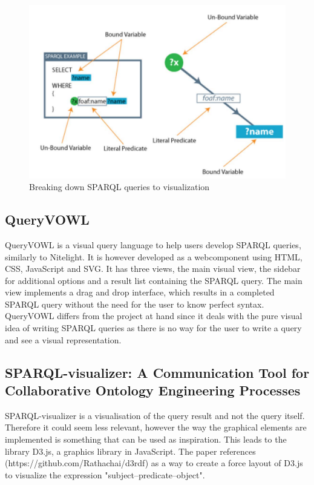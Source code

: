 \begin{figure}[H]
    \centering
  \includegraphics[width=.9\linewidth]{figures/NitelightFigure2.pdf}
  \caption{Breaking down SPARQL queries to visualization\cite{Nitelight}}
  \label{fig:NitelightBreakDown}
\end{figure}

\subsection{QueryVOWL}
QueryVOWL is a visual query language to help users develop SPARQL queries\cite{QueryVOWL}, similarly to Nitelight. It is however developed as a webcomponent using HTML, CSS, JavaScript and SVG. It has three views, the main visual view, the sidebar for additional options and a result list containing the SPARQL query. The main view implements a drag and drop interface, which results in a completed SPARQL query without the need for the user to know perfect syntax. QueryVOWL differs from the project at hand since it deals with the pure visual idea of writing SPARQL queries as there is no way for the user to write a query and see a visual representation. 

\subsection{SPARQL-visualizer: A Communication Tool for Collaborative Ontology Engineering Processes}
SPARQL-visualizer is a visualisation of the query result\cite{MadsHoltenSPARQL} and not the query itself. Therefore it could seem less relevant, however the way the graphical elements are implemented is something that can be used as inspiration. This leads to the library D3.js, a graphics library in JavaScript. The paper references (https://github.com/Rathachai/d3rdf) as a way to create a force layout of D3.js to visualize the expression "subject–predicate–object".

